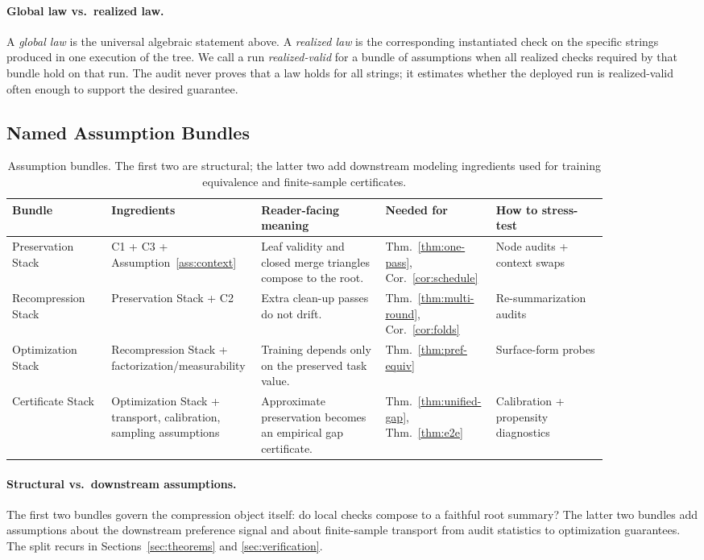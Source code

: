 \paragraph{Global law vs.\ realized law.}
A \emph{global law} is the universal algebraic statement above. A \emph{realized law} is the corresponding instantiated check on the specific strings produced in one execution of the tree. We call a run \emph{realized-valid} for a bundle of assumptions when all realized checks required by that bundle hold on that run. The audit never proves that a law holds for all strings; it estimates whether the deployed run is realized-valid often enough to support the desired guarantee.

\subsection{Named Assumption Bundles}

\begin{table}[htbp]
\centering\footnotesize
\setlength{\tabcolsep}{3pt}
\begin{tabular}{p{0.16\linewidth}p{0.18\linewidth}p{0.20\linewidth}p{0.14\linewidth}p{0.18\linewidth}}
\toprule
Bundle & Ingredients & Reader-facing meaning & Needed for & How to stress-test \\
\midrule
Preservation Stack & C1 + C3 + Assumption~\ref{ass:context} & Leaf validity and closed merge triangles compose to the root. & Thm.~\ref{thm:one-pass}, Cor.~\ref{cor:schedule} & Node audits + context swaps \\
Recompression Stack & Preservation Stack + C2 & Extra clean-up passes do not drift. & Thm.~\ref{thm:multi-round}, Cor.~\ref{cor:folds} & Re-summarization audits \\
Optimization Stack & Recompression Stack + factorization/measurability & Training depends only on the preserved task value. & Thm.~\ref{thm:pref-equiv} & Surface-form probes \\
Certificate Stack & Optimization Stack + transport, calibration, sampling assumptions & Approximate preservation becomes an empirical gap certificate. & Thm.~\ref{thm:unified-gap}, Thm.~\ref{thm:e2e} & Calibration + propensity diagnostics \\
\bottomrule
\end{tabular}
\caption{Assumption bundles. The first two are structural; the latter two add downstream modeling ingredients used for training equivalence and finite-sample certificates.}
\label{tab:assumption-bundles}
\end{table}

\paragraph{Structural vs.\ downstream assumptions.}
The first two bundles govern the compression object itself: do local checks compose to a faithful root summary? The latter two bundles add assumptions about the downstream preference signal and about finite-sample transport from audit statistics to optimization guarantees. The split recurs in Sections~\ref{sec:theorems} and \ref{sec:verification}.
